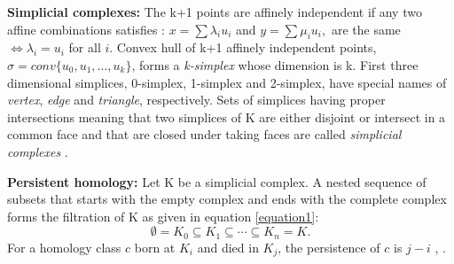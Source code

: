 \documentclass[12pt]{extarticle}
\begin{document}
\textbf{Simplicial complexes:} The k+1 points are affinely independent if any two affine combinations satisfies :
$ x = \sum \lambda_i u_i$ and $y = \sum \mu_i u_i,$
are the same $\iff \lambda_i = u_i $ for all $i$.
Convex hull of k+1 affinely independent points, $\sigma=conv\{ u_0, u_1,...,u_k  \} $, forms a \textit{k-simplex} whose dimension is k. First three dimensional simplices, 0-simplex, 1-simplex and 2-simplex, have special names of \textit{vertex}, \textit{edge} and \textit{triangle}, respectively. Sets of simplices having proper intersections meaning that two simplices of K are either disjoint or intersect in a common face and that are closed under taking faces are called \textit{simplicial complexes} \cite{edelsbrunner2010computational}. 

\textbf{Persistent homology:} Let K be a simplicial complex.
A nested sequence of subsets that starts with the empty complex and ends with the complete complex forms the filtration of K as given in equation \eqref{equation1}:
\begin{equation}\label{equation1}
\emptyset= K_0 \subseteq K_1 \subseteq\cdots\subseteq K_n = K.
\end{equation}
For a homology class $c$ born at $K_i$ and died in $K_j$, the persistence of $c$ is $j-i$ \cite{edelsbrunner2010computational}, \cite{edelsbrunner2008persistent}. 
\end{document}
